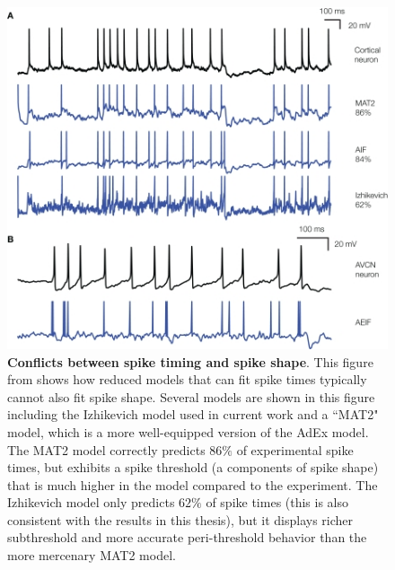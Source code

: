 \begin{figure}
    \centering
    \includegraphics[scale=5.0]{figures/IZHIkevich_fit_60Adexp_80.jpg}
    \caption[Model Fits in Prior Work]{\textbf{Conflicts between spike timing and spike shape}.
    This figure from  \cite{rossant2011fitting} shows how reduced models that can fit spike times typically cannot also fit spike shape.
    Several models are shown in this figure including the Izhikevich model used in current work and a ``MAT2" model, which is a more well-equipped version of the AdEx model.
    The MAT2 model correctly predicts $86\%$ of experimental spike times, but exhibits a spike threshold (a components of spike shape) that is much higher in the model compared to the experiment.
    The Izhikevich model only predicts $62\%$ of spike times (this is also consistent with the results in this thesis), but it displays richer subthreshold and more accurate peri-threshold behavior than the more mercenary MAT2 model.} 
    \label{fig:rossant-fits}
\end{figure}

